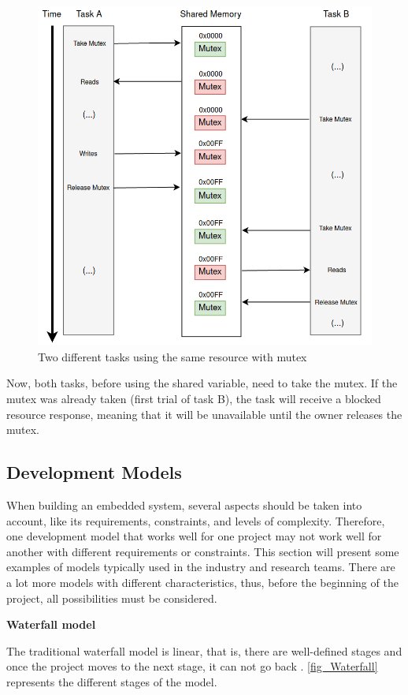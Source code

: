 \begin{figure}[H]
	\centering
 	\includegraphics[width=0.7\linewidth]{Images/AfterMutex.png}
 	\caption{ Two different tasks using the same resource with mutex }
	 \label{fig_AfterMutex}
\end{figure}

Now, both tasks, before using the shared variable, need to take the mutex. If the mutex was already taken (first trial of task B), 
the task will receive a blocked resource response, meaning that it will be unavailable until the owner releases the mutex. 


\subsection{Development Models}
\label{sub_sec::DevModels}

When building an embedded system, several aspects should be taken into account, like its requirements, constraints, and levels of complexity.  
Therefore, one development model that works well for one project may not work well for another with different requirements or constraints. This 
section will present some examples of models typically used in the industry and research teams. There are a lot more models with different 
characteristics, thus, before the beginning of the project, all possibilities must be considered.
\newline

\textbf{Waterfall model}
\newline

The traditional waterfall model is linear, that is, there are well-defined stages and once the project moves to the next stage, it can not go 
back \cite{waterfallModel}. \autoref{fig_Waterfall} represents the different stages of the model. 

